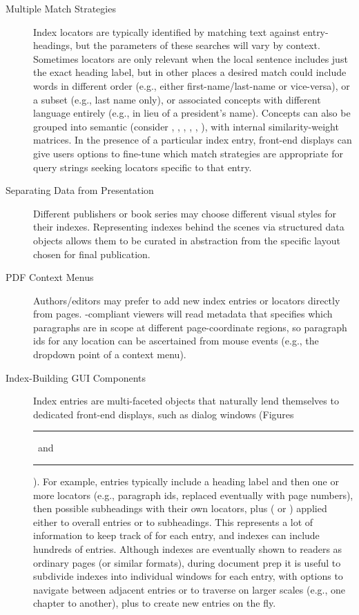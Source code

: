 \documentclass[11pt]{article}
\newcommand\reduline{\bgroup\markoverwith
{\textcolor{ru}{\rule[-.25ex]{3pt}{3.4pt}}}\ULon}
\DeclareRobustCommand{\xfigunderline}[1]{\reduline{#1}
\llap{\dashuline{\phantom{#1}}}%
}
\renewcommand{\Atref}[1]{\textcolor{rgrAt!30}{\xfigunderline{\hspace{-2pt}\autoref{#1}\hspace*{-2pt}}}}
\begin{document}
{{\begin{description}
\item[Multiple Match Strategies]  Index locators are typically 
identified by matching text against entry-headings, but the parameters 
of these searches will vary by context.  Sometimes locators are 
only relevant when the local sentence includes just the exact 
heading label, but in other places a desired match could 
include words in different order (e.g., either first-name/last-name 
or vice-versa), or a subset (e.g., last name only), 
or associated concepts with different language entirely 
(e.g.,  in lieu of a president's name). 
Concepts can also be grouped into semantic  
(consider , , , 
, , ), 
with internal similarity-weight matrices.  In the 
presence of a particular index entry, front-end displays can 
give users options to fine-tune which match strategies are 
appropriate for query strings seeking locators specific to that entry.



\item[Separating Data from Presentation]  Different publishers 
or book series may choose different visual styles for their 
indexes.  Representing indexes behind the scenes via structured 
data objects allows them to be curated in abstraction from the 
specific layout chosen for final publication.  

\vspace{-3pt}

\item[PDF Context Menus]  Authors/editors may prefer to add new index entries 
or locators directly from \PDF{} pages.  \lPacTk{}-compliant 
viewers will read metadata that specifies which paragraphs are 
in scope at different page-coordinate regions, so paragraph ids 
for any location can be ascertained from mouse events (e.g., 
the dropdown point of a context menu).

\vspace{-3pt}

\item[Index-Building GUI Components]  Index entries are multi-faceted 
objects that naturally lend themselves to dedicated front-end displays, 
such as dialog windows (Figures~\Atref{fig:ss3}~and~\Atref{fig:ss4}).  
For example, entries typically include a heading 
label and then one or more locators (e.g., paragraph ids, replaced 
eventually with page numbers), 
then possible subheadings with their own 
locators, plus  ( or ) applied 
either to overall entries or to subheadings.  This represents a lot 
of information to keep track of for each entry, and indexes can include 
hundreds of entries.  Although indexes are eventually shown 
to readers as ordinary \PDF{} pages (or similar formats), 
during document prep it is useful to subdivide indexes into 
individual \GUI{} windows for each entry, with options to 
navigate between adjacent entries or to traverse on larger 
scales (e.g., one chapter to another), plus to create new 
entries on the fly.


\end{description}}}
\end{document}
